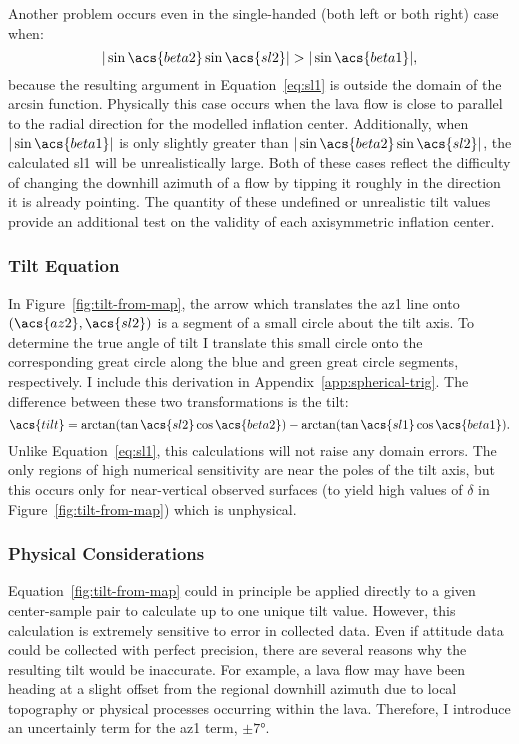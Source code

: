 Another problem occurs even in the single-handed (both left or both right) case when:
\begin{equation}
     |\sin\acs{beta2}\sin\acs{sl2}| > |\sin\acs{beta1}|,\label{eq:domain-error}
\end{equation}
because the resulting argument in Equation~\eqref{eq:sl1} is outside the domain of the arcsin function. Physically this case occurs when the lava flow is close to parallel to the radial direction for the modelled inflation center. Additionally, when $|\sin\acs{beta1}|$ is only slightly greater than $|\sin\acs{beta2}\sin\acs{sl2}|$, the calculated \acs{sl1} will be unrealistically large. Both of these cases reflect the difficulty of changing the downhill azimuth of a flow by tipping it roughly in the direction it is already pointing. The quantity of these undefined or unrealistic tilt values provide an additional test on the validity of each axisymmetric inflation center.

\subsubsection{Tilt Equation}

In Figure~\ref{fig:tilt-from-map}, the arrow which translates the \acs{az1} line onto $\left(\acs{az2},\acs{sl2}\right)$ is a segment of a small circle about the tilt axis. To determine the true angle of tilt I translate this small circle onto the corresponding great circle along the blue and green great circle segments, respectively. I include this derivation in Appendix~\ref{app:spherical-trig}. The difference between these two transformations is the tilt: 
\begin{equation}
    \acs{tilt} = \arctan(\tan\acs{sl2}\cos\acs{beta2}) - \arctan(\tan\acs{sl1}\cos\acs{beta1}).\label{eq:tilt-from-map}
\end{equation}
Unlike Equation~\eqref{eq:sl1}, this calculations will not raise any domain errors. The only regions of high numerical sensitivity are near the poles of the tilt axis, but this occurs only for near-vertical observed surfaces (to yield high values of $\delta$ in Figure~\ref{fig:tilt-from-map}) which is unphysical.

\subsubsection{Physical Considerations}

Equation~\eqref{fig:tilt-from-map} could in principle be applied directly to a given center-sample pair to calculate up to one unique tilt value. However, this calculation is extremely sensitive to error in collected data. Even if attitude data could be collected with perfect precision, there are several reasons why the resulting tilt would be inaccurate. For example, a lava flow may have been heading at a slight offset from the regional downhill azimuth due to local topography or physical processes occurring within the lava. Therefore, I introduce an uncertainly term for the \acs{az1} term, $\pm\ang{7}$. 

